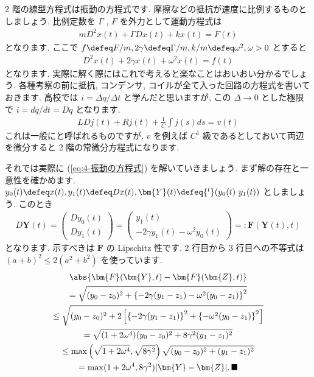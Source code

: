 \documentclass[openany, a4paper, oneside]{jsbook}
\begin{document}
2 階の線型方程式は振動の方程式です.
摩擦などの抵抗が速度に比例するものとしましょう.
比例定数を $\Gamma$ ,  $F$ を外力として運動方程式は
\begin{gather}
m D^2 x (t) + \Gamma D x (t) + k x (t) = F (t)
\end{gather}
となります.
ここで $f \defeq F/m , 2 \gamma \defeq \Gamma / m , k/m \defeq \omega^2 , \omega>0$ とすると
\begin{gather}
D^2 x (t) + 2 \gamma x (t) + \omega^2 x (t) = f (t)
\label{eq:4-振動の方程式}
\end{gather}
となります.
実際に解く際にはこれで考えると楽なことはおいおい分かるでしょう.
各種考察の前に抵抗, コンデンサ, コイルが全て入った回路の方程式を書いておきます.
高校では $i = \varDelta q / \varDelta t$ と学んだと思いますが,
この $\varDelta \to 0$ とした極限で $i = dq / dt = D q$ となります.
\begin{gather}
L D j (t) + R j (t) + \frac{1}{C} \int j (s) ds = v (t)
\end{gather}
これは一般にと呼ばれるものですが,
$v$ を例えば $C^1$ 級であるとしておいて両辺を微分すると 2 階の常微分方程式になります.

それでは実際に (\ref{eq:4-振動の方程式}) を解いていきましょう.
まず解の存在と一意性を確かめます.
$y_0 (t) \defeq x (t) , y_1 (t) \defeq Dx (t) , \bm{Y}(t) \defeq {^t}( y_0 (t) \,\, y_1 (t) )$ としましょう.
このとき
\begin{gather}
D \bm{Y}(t)
=
\begin{pmatrix}
D y_0 (t) \\
D y_1 (t)
\end{pmatrix}
=
\begin{pmatrix}
y_1 (t) \\
-2 \gamma y_1 (t) - \omega ^2 y_0 (t)
\end{pmatrix}
=:
\bm{F}(\bm{Y}(t) ,t)
\end{gather}
となります.
示すべきは $\bm{F}$ の Lipschitz 性です.
2 行目から 3 行目への不等式は $( a + b )^2 \leq 2 ( a^2 + b^2 )$ を使っています.
\begin{gather}
\abs{\bm{F}(\bm{Y},t) - \bm{F}( \bm{Z}, t )} \\
=
\sqrt{ ( y_0 - z_0 )^2 + \left \{ -2\gamma ( y_1 - z_1 ) - \omega ^2 ( y_0 - z_1 ) \right \} ^2 } \\
\leq
\sqrt{ ( y_0 - z_0 )^2 +
2 \left[ \left \{ -2\gamma ( y_1 - z_1 ) \right \} ^2 + \left \{ - \omega ^2 ( y_0 - z_1 ) \right \} ^2 \right ] } \\
=
\sqrt{ ( 1 + 2 \omega ^4 ) ( y_0 - z_0 )^2 + 8 \gamma ^2 ( y_1 - z_1 ) ^2 } \\
\leq
\max \left ( \sqrt{ 1 + 2 \omega ^4 } , \sqrt{ 8 \gamma ^2 } \right) \sqrt{ ( y_0 - z_0 )^2 + ( y_1 - z_1 ) ^2 } \\
=
\max ( 1 + 2 \omega ^4 , 8 \gamma ^2 ) | \bm{Y} - \bm{Z} | . \, \blacksquare
\end{gather}
\end{document}
